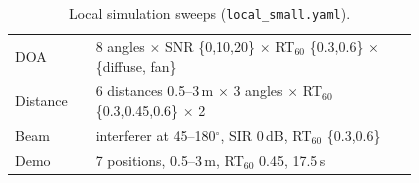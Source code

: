\begin{table}[t]
\centering\small
\begin{tabular}{@{}lp{0.8\linewidth}@{}}
\toprule
DOA & 8 angles $\times$ SNR \{0,10,20\} $\times$ RT$_{60}$ \{0.3,0.6\} $\times$ \{diffuse, fan\} \\
Distance & 6 distances 0.5--3\,m $\times$ 3 angles $\times$ RT$_{60}$ \{0.3,0.45,0.6\} $\times$ 2 \\
Beam & interferer at 45--180$^\circ$, SIR 0\,dB, RT$_{60}$ \{0.3,0.6\} \\
Demo & 7 positions, 0.5--3\,m, RT$_{60}$ 0.45, 17.5\,s \\
\bottomrule
\end{tabular}
\caption{Local simulation sweeps (\texttt{local\_small.yaml}).}
\label{tab:setup}
\end{table}
